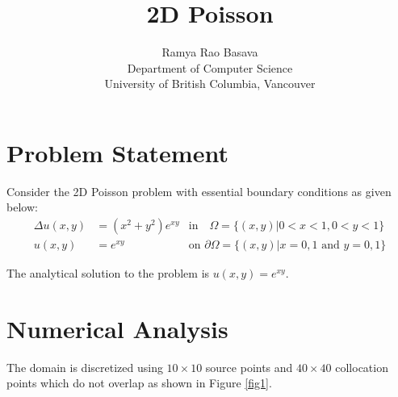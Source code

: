 \documentclass[11pt, letterpaper]{article}
\title{\textbf{2D Poisson}}
\author{Ramya Rao Basava\\
Department of Computer Science\\
University of British Columbia, Vancouver}
\date{}
\begin{document}
\maketitle

\section{Problem Statement}
Consider the 2D Poisson problem with essential boundary conditions as given
below:
\begin{align*}
\Delta u (x,y) &= (x^2+y^2)e^{xy} &\text{in} \quad \Omega = \{(x,y) \vert 0 < x < 1,0 < y < 1\} \\
u (x,y) &= e^{xy} \quad &\text{on }  \partial\Omega = \{(x,y) \vert x=0,1 \text{ and } y=0,1\}
\end{align*}

The analytical solution to the problem is $u (x,y) = e^{xy}$.

\section{Numerical Analysis}

The domain is discretized using $10\times10$ source points and  $40\times40$ collocation points which do not overlap as shown in Figure \ref{fig1}. 
\end{document}
